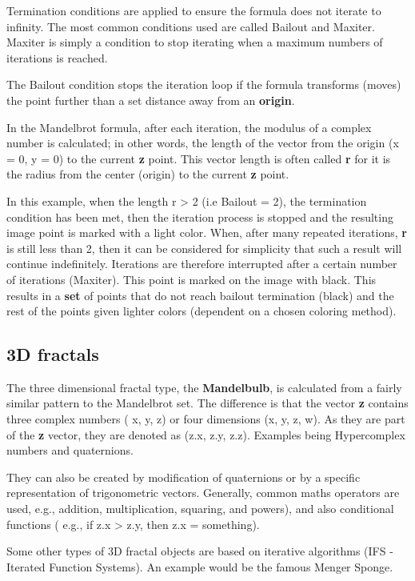 Termination conditions are applied to ensure the formula does not
iterate to infinity. The most common conditions used are called Bailout
and Maxiter. Maxiter is simply a condition to stop iterating when a
maximum numbers of iterations is reached.

The Bailout condition stops the iteration loop if the formula transforms
(moves) the point further than a set distance away from an \textbf{origin}.

In the Mandelbrot formula, after each iteration, the modulus of a
complex number is calculated; in other words, the length of the vector
from the origin (x = 0, y = 0) to the current \textbf{z} point. This vector
length is often called \textbf{r} for it is the radius from the center
(origin) to the current \textbf{z} point.

In this example, when the length r > 2 (i.e Bailout = 2),
the termination condition has been met, then the iteration process is
stopped and the resulting image point is marked with a light color.
When, after many repeated iterations, \textbf{r} is still less than 2, then
it can be considered for simplicity that such a result will continue
indefinitely. Iterations are therefore interrupted after a certain
number of iterations (Maxiter). This point is marked on the image with
black. This results in a \textbf{set} of points that do not reach bailout
termination (black) and the rest of the points given lighter colors
(dependent on a chosen coloring method).

\subsection{3D fractals}\label{d-fractals}

The three dimensional fractal type, the \textbf{Mandelbulb}, is calculated from
a fairly similar pattern to the Mandelbrot set. The difference is that
the vector \textbf{z} contains three complex numbers ( x, y, z) or four
dimensions (x, y, z, w). As they are part of the \textbf{z} vector, they are
denoted as (z.x, z.y, z.z). Examples being Hypercomplex numbers and
quaternions.

They can also be created by modification of quaternions or by a specific
representation of trigonometric vectors. Generally, common maths
operators are used, e.g., addition, multiplication, squaring, and
powers), and also conditional functions ( e.g., if z.x > z.y, then z.x = something).

Some other types of 3D fractal objects are based on iterative algorithms
(IFS - Iterated Function Systems). An example would be the famous Menger
Sponge.

